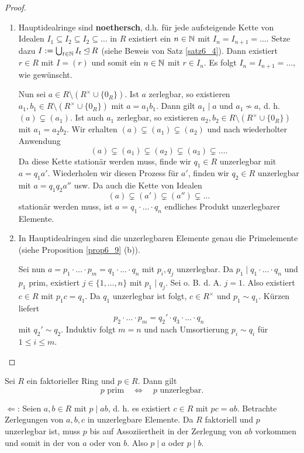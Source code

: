 \begin{proof}
	\begin{enumerate}
		\item Hauptidealringe sind \textbf{noethersch}, d.h. für jede aufsteigende Kette von Idealen $I_1 \subseteq I_2 \subseteq I_2 \subseteq \dots$ in $R$ existiert ein $n \in \mathbb{N}$ mit $I_n = I_{n+1} = \dots$. Setze dazu $I := \bigcup_{t \in \mathbb{N}} I_t \unlhd R$ (siehe Beweis von Satz \ref{satz6_4}). Dann existiert $r \in R$ mit $I = (r)$ und somit ein $n \in \mathbb{N}$ mit $r \in I_n$. Es folgt $I_n = I_{n+1} = \dots$, wie gewünscht. 
		
		Nun sei $a \in R \setminus (R^\times \cup \{0_R\})$. Ist $a$ zerlegbar, so existieren $a_1, b_1 \in R \setminus (R^\times \cup \{0_R\})$ mit $a = a_1 b_1$. Dann gilt $a_1 \mid a$ und $a_1 \not\sim a$, d. h. $(a) \subsetneq (a_1)$. Ist auch $a_1$ zerlegbar, so existieren $a_2, b_2 \in R \setminus (R^\times \cup \{0_R\})$ mit $a_1 = a_2 b_2$. Wir erhalten $(a) \subsetneq (a_1) \subsetneq (a_2)$ und nach wiederholter Anwendung
		\[(a) \subsetneq (a_1) \subsetneq (a_2) \subsetneq (a_3) \subsetneq \dots.\]
		Da diese Kette stationär werden muss, finde wir $q_1 \in R$ unzerlegbar mit $a = q_1 a'$. Wiederholen wir diesen Prozess für $a'$, finden wir $q_2 \in R$ unzerlegbar mit $a = q_1 q_2 a''$ usw. Da auch die Kette von Idealen
		\[(a) \subsetneq (a') \subsetneq (a'') \subsetneq \dots\]
		stationär werden muss, ist $a = q_1 \cdot \dots \cdot q_n$ endliches Produkt unzerlegbarer Elemente.
		\item In Hauptidealringen sind  die unzerlegbaren Elemente genau die Primelemente (siehe Proposition \ref{prop6_9} (b)). 
		
		Sei nun $a = p_1 \cdot \dots \cdot p_m = q_1 \cdot \dots \cdot q_n$ mit $p_i, q_j$ unzerlegbar. Da $p_1 \mid q_1 \cdot \dots \cdot q_n$ und $p_1$ prim, existiert $j \in \{1,\dots,n\}$ mit $p_1 \mid q_j$. Sei o. B. d. A. $j = 1$. Also existiert $c \in R$ mit $p_1 c   = q_1$. Da $q_1$ unzerlegbar ist folgt, $c \in R^\times$ und $p_1 \sim q_1$. Kürzen liefert
		\[p_2 \cdot \dots \cdot p_m = q_2' \cdot q_3 \cdot \dots \cdot q_n\]
		mit $q_2' \sim q_2$. Induktiv folgt $m = n$ und nach Umsortierung $p_i \sim q_i$ für $1 \leq i \leq m$.
	\end{enumerate}
\end{proof} 
\begin{rem}\label{rem6_14}
	Sei $R$ ein faktorieller Ring und $p \in R$. Dann gilt 
	\[p \text{ prim} \quad\Leftrightarrow\quad p \text{ unzerlegbar}.\]
	\begin{inlproof}
		\glqq{}$\Leftarrow$\grqq: Seien $a, b \in R$ mit $p \mid ab$, d. h. es existiert $c \in R$ mit $pc = ab$. Betrachte Zerlegungen von $a,b,c$ in unzerlegbare Elemente. Da $R$ faktoriell und $p$ unzerlegbar ist, muss $p$ bis auf Assoziiertheit in der Zerlegung von $ab$ vorkommen und somit in der von $a$ oder von $b$. Also $p \mid a$ oder $p \mid b$.
	\end{inlproof}
\end{rem}
